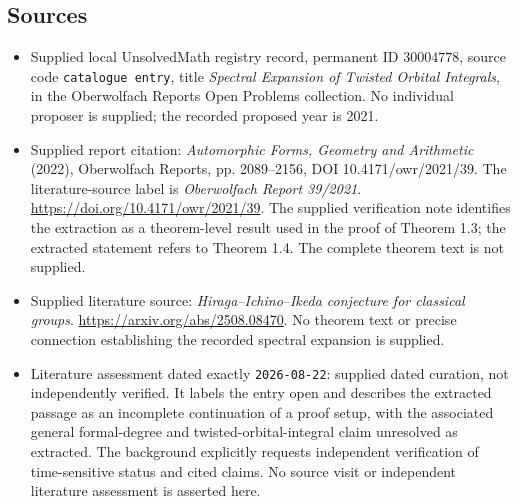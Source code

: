 \documentclass[11pt]{article}
\begin{document}
\subsection{Sources}
\begin{itemize}
\item Supplied local UnsolvedMath registry record, permanent ID \(30004778\), source code \texttt{catalogue entry}, title \emph{Spectral Expansion of Twisted Orbital Integrals}, in the Oberwolfach Reports Open Problems collection. No individual proposer is supplied; the recorded proposed year is 2021.
\item Supplied report citation: \emph{Automorphic Forms, Geometry and Arithmetic} (2022), Oberwolfach Reports, pp. 2089--2156, DOI 10.4171/owr/2021/39. The literature-source label is \emph{Oberwolfach Report 39/2021}. \url{https://doi.org/10.4171/owr/2021/39}. The supplied verification note identifies the extraction as a theorem-level result used in the proof of Theorem 1.3; the extracted statement refers to Theorem 1.4. The complete theorem text is not supplied.
\item Supplied literature source: \emph{Hiraga--Ichino--Ikeda conjecture for classical groups}. \url{https://arxiv.org/abs/2508.08470}. No theorem text or precise connection establishing the recorded spectral expansion is supplied.
\item Literature assessment dated exactly \texttt{2026-08-22}: supplied dated curation, not independently verified. It labels the entry open and describes the extracted passage as an incomplete continuation of a proof setup, with the associated general formal-degree and twisted-orbital-integral claim unresolved as extracted. The background explicitly requests independent verification of time-sensitive status and cited claims. No source visit or independent literature assessment is asserted here.
\end{itemize}
\end{document}
